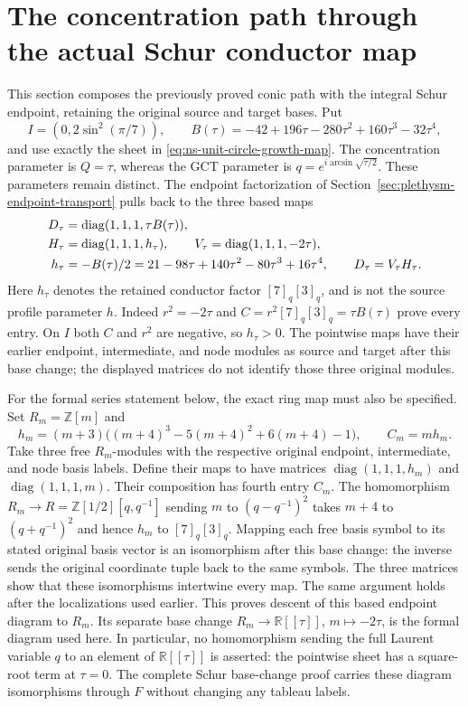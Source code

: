 \section{The concentration path through the actual Schur conductor map}
\label{sec:ns-schur-path}

This section composes the previously proved conic path with the integral
Schur endpoint, retaining the original source and target bases. Put
\[
 I=(0,2\sin^2(\pi/7)),\qquad
 B(\tau)=-42+196\tau-280\tau^2+160\tau^3-32\tau^4,
\]
and use exactly the sheet in \eqref{eq:ns-unit-circle-growth-map}.
The concentration parameter is $Q=\tau$, whereas the GCT parameter is
$q=e^{i\arcsin\sqrt{\tau/2}}$. These parameters remain distinct.
The endpoint factorization of Section~\ref{sec:plethysm-endpoint-transport}
pulls back to the three based maps
\begin{align}
 D_\tau&=\operatorname{diag}(1,1,1,\tau B(\tau)),\notag\\
 H_\tau&=\operatorname{diag}(1,1,1,h_\tau),\qquad
 V_\tau=\operatorname{diag}(1,1,1,-2\tau),\notag\\
 h_\tau&=-B(\tau)/2
 =21-98\tau+140\tau^2-80\tau^3+16\tau^4,\qquad
 D_\tau=V_\tau H_\tau.\label{eq:ns-schur-original-factorization}
\end{align}
Here $h_\tau$ denotes the retained conductor factor $[7]_q[3]_q$,
and is not the source profile parameter $h$. Indeed $r^2=-2\tau$
and $C=r^2[7]_q[3]_q=\tau B(\tau)$ prove every entry.
On $I$ both $C$ and $r^2$ are negative, so $h_\tau>0$.
The pointwise maps have their earlier endpoint, intermediate, and node modules
as source and target after this base change; the displayed matrices
do not identify those three original modules.

For the formal series statement below, the exact ring map must also be
specified. Set $R_m=\mathbb Z[m]$ and
\[
 h_m=(m+3)\bigl((m+4)^3-5(m+4)^2+6(m+4)-1\bigr),
 \qquad C_m=mh_m.
\]
Take three free $R_m$-modules with the respective original endpoint,
intermediate, and node basis labels. Define their maps to have matrices
$\operatorname{diag}(1,1,1,h_m)$ and
$\operatorname{diag}(1,1,1,m)$. Their composition has fourth entry
$C_m$. The homomorphism $R_m\to R=\mathbb Z[1/2][q,q^{-1}]$ sending
$m$ to $(q-q^{-1})^2$ takes $m+4$ to $(q+q^{-1})^2$ and hence
$h_m$ to $[7]_q[3]_q$. Mapping each free basis symbol to its stated
original basis vector is an isomorphism after this base change: the
inverse sends the original coordinate tuple back to the same symbols.
The three matrices show that these isomorphisms intertwine every map.
The same argument holds after the localizations used earlier.
This proves descent of this based endpoint diagram to $R_m$.
Its separate base change $R_m\to\mathbb R[[\tau]]$, $m\mapsto-2\tau$,
is the formal diagram used here. In particular, no homomorphism sending
the full Laurent variable $q$ to an element of $\mathbb R[[\tau]]$ is
asserted: the pointwise sheet has a square-root term at $\tau=0$.
The complete Schur base-change proof carries these diagram
isomorphisms through $F$ without changing any tableau labels.

